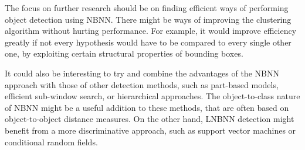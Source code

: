 
The focus on further research should be on finding efficient ways of performing object detection using NBNN. There might be ways of improving the clustering algorithm without hurting performance. For example, it would improve efficiency greatly if not every hypothesis would have to be compared to every single other one, by exploiting certain structural properties of bounding boxes.

It could also be interesting to try and combine the advantages of the NBNN approach with those of other detection methods, such as part-based models, efficient sub-window search, or hierarchical approaches. The object-to-class nature of NBNN might be a useful addition to these methods, that are often based on object-to-object distance measures. On the other hand, LNBNN detection might benefit from a more discriminative approach, such as support vector machines or conditional random fields.



